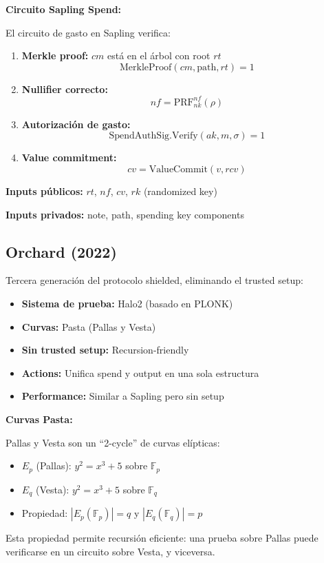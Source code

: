 \documentclass[11pt,a4paper,twoside]{book}
\begin{document}
\begin{mathnote}
\textbf{Circuito Sapling Spend:}

El circuito de gasto en Sapling verifica:

\begin{enumerate}
    \item \textbf{Merkle proof:} $cm$ est\'a en el \'arbol con root $rt$
    \[
    \text{MerkleProof}(cm, \text{path}, rt) = 1
    \]
    
    \item \textbf{Nullifier correcto:}
    \[
    nf = \text{PRF}_{nk}^{nf}(\rho)
    \]
    
    \item \textbf{Autorizaci\'on de gasto:}
    \[
    \text{SpendAuthSig.Verify}(ak, m, \sigma) = 1
    \]
    
    \item \textbf{Value commitment:}
    \[
    cv = \text{ValueCommit}(v, rcv)
    \]
\end{enumerate}

\textbf{Inputs p\'ublicos:} $rt$, $nf$, $cv$, $rk$ (randomized key)

\textbf{Inputs privados:} note, path, spending key components
\end{mathnote}

\subsection{Orchard (2022)}

\begin{definition}[Orchard]
Tercera generaci\'on del protocolo shielded, eliminando el trusted setup:
\begin{itemize}
    \item \textbf{Sistema de prueba:} Halo2 (basado en PLONK)
    \item \textbf{Curvas:} Pasta (Pallas y Vesta)
    \item \textbf{Sin trusted setup:} Recursion-friendly
    \item \textbf{Actions:} Unifica spend y output en una sola estructura
    \item \textbf{Performance:} Similar a Sapling pero sin setup
\end{itemize}
\end{definition}

\begin{mathnote}
\textbf{Curvas Pasta:}

Pallas y Vesta son un ``2-cycle'' de curvas el\'ipticas:
\begin{itemize}
    \item $E_p$ (Pallas): $y^2 = x^3 + 5$ sobre $\mathbb{F}_p$
    \item $E_q$ (Vesta): $y^2 = x^3 + 5$ sobre $\mathbb{F}_q$
    \item Propiedad: $|E_p(\mathbb{F}_p)| = q$ y $|E_q(\mathbb{F}_q)| = p$
\end{itemize}

Esta propiedad permite recursi\'on eficiente: una prueba sobre Pallas puede verificarse en un circuito sobre Vesta, y viceversa.
\end{mathnote}
\end{document}
